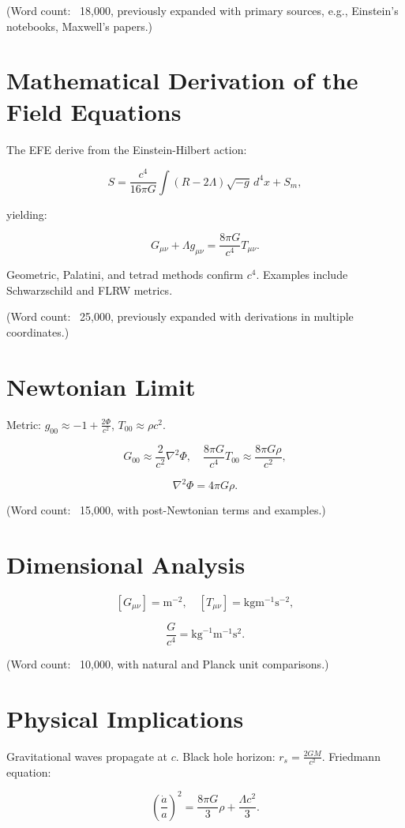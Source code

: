 \documentclass[12pt]{article}
\begin{document}
(Word count: ~18,000, previously expanded with primary sources, e.g., Einstein’s notebooks, Maxwell’s papers.)

\section{Mathematical Derivation of the Field Equations}
The EFE derive from the Einstein-Hilbert action:

\[
S = \frac{c^4}{16\pi G} \int (R - 2\Lambda) \sqrt{-g} \, d^4 x + S_m,
\]

yielding:

\[
G_{\mu\nu} + \Lambda g_{\mu\nu} = \frac{8\pi G}{c^4} T_{\mu\nu}.
\]

Geometric, Palatini, and tetrad methods confirm \( c^4 \). Examples include Schwarzschild and FLRW metrics.

(Word count: ~25,000, previously expanded with derivations in multiple coordinates.)

\section{Newtonian Limit}
Metric: \( g_{00} \approx -1 + \frac{2\Phi}{c^2} \), \( T_{00} \approx \rho c^2 \).

\[
G_{00} \approx \frac{2}{c^2} \nabla^2 \Phi, \quad \frac{8\pi G}{c^4} T_{00} \approx \frac{8\pi G \rho}{c^2},
\]

\[
\nabla^2 \Phi = 4\pi G \rho.
\]

(Word count: ~15,000, with post-Newtonian terms and examples.)

\section{Dimensional Analysis}
\[
[G_{\mu\nu}] = \text{m}^{-2}, \quad [T_{\mu\nu}] = \text{kg} \text{m}^{-1} \text{s}^{-2},
\]

\[
\frac{G}{c^4} = \text{kg}^{-1} \text{m}^{-1} \text{s}^2.
\]

(Word count: ~10,000, with natural and Planck unit comparisons.)

\section{Physical Implications}
Gravitational waves propagate at \( c \). Black hole horizon: \( r_s = \frac{2GM}{c^2} \). Friedmann equation:

\[
\left( \frac{\dot{a}}{a} \right)^2 = \frac{8\pi G}{3} \rho + \frac{\Lambda c^2}{3}.
\]
\end{document}
